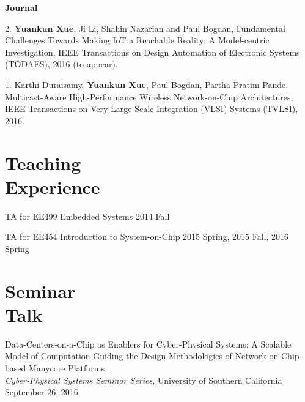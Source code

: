 \documentclass[margin,line]{cv}
\begin{document}
\begin{resume}
\begin{list}{*}{}
    \end{list}
    \textbf{Journal} \\
    \begin{list}{*}{}
    \item [2.] \textbf{Yuankun Xue}, Ji Li, Shahin Nazarian and Paul Bogdan, Fundamental Challenges Towards Making IoT a Reachable Reality: A Model-centric Investigation, IEEE Transactions on Design Automation of Electronic Systems (TODAES), 2016 (to appear).
    
\item [1.] Karthi Duraisamy, \textbf{Yuankun Xue}, Paul Bogdan, Partha Pratim Pande, Multicast-Aware High-Performance Wireless Network-on-Chip Architectures, IEEE Transactions on Very Large Scale Integration (VLSI) Systems (TVLSI), 2016.
    	
    \end{list}
    \section{\mysidestyle Teaching\\Experience}

    TA for EE499 Embedded Systems \hfill  2014 Fall
    
TA for EE454 Introduction to System-on-Chip \hfill 2015 Spring, 2015 Fall, 2016 Spring \\

    \section{\mysidestyle Seminar\\Talk}
    
    Data-Centers-on-a-Chip as Enablers for Cyber-Physical Systems: A Scalable Model of Computation Guiding the Design Methodologies of Network-on-Chip based Manycore Platforms\\
    \textit{Cyber-Physical Systems Seminar Series}, University of Southern California\\
    September 26, 2016

    
    
\end{resume}
\end{document}
